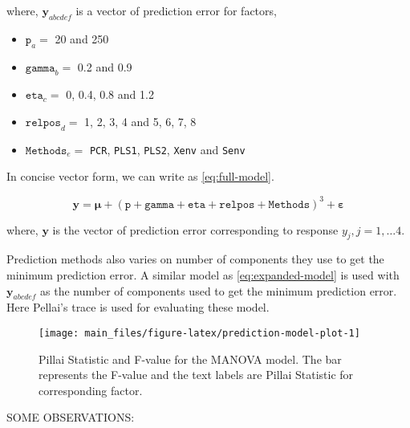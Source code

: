 \documentclass[12pt,3p,authoryear]{elsarticle}
\providecommand{\tightlist}{%
  \setlength{\itemsep}{0pt}\setlength{\parskip}{0pt}}
\theoremstyle{definition}
\theoremstyle{definition}
\theoremstyle{definition}
\theoremstyle{remark}
\begin{document}
where, \(\mathbf{y}_{abcdef}\) is a vector of prediction error for
factors,

\begin{itemize}
\tightlist
\item
  \(\texttt{p}_a =\) 20 and 250
\item
  \(\texttt{gamma}_b=\) 0.2 and 0.9
\item
  \(\texttt{eta}_c=\) 0, 0.4, 0.8 and 1.2
\item
  \(\texttt{relpos}_d=\) 1, 2, 3, 4 and 5, 6, 7, 8
\item
  \(\texttt{Methods}_e=\) \texttt{PCR}, \texttt{PLS1}, \texttt{PLS2},
  \texttt{Xenv} and \texttt{Senv}
\end{itemize}

In concise vector form, we can write as \eqref{eq:full-model}.

\begin{equation}
\mathbf{y} = \boldsymbol{\mu} + (\texttt{p} + \texttt{gamma} + \texttt{eta} + \texttt{relpos} + \texttt{Methods})^3 + \boldsymbol{\varepsilon}
\label{eq:full-model}
\end{equation}

where, \(\mathbf{y}\) is the vector of prediction error corresponding to
response \(y_j, j = 1, \ldots 4\).

Prediction methods also varies on number of components they use to get
the minimum prediction error. A similar model as \eqref{eq:expanded-model}
is used with \(\mathbf{y}_{abcdef}\) as the number of components used to
get the minimum prediction error. Here Pellai's trace is used for
evaluating these model.

\begin{figure}
\texttt{[image: main\_files/figure-latex/prediction-model-plot-1]} \caption{Pillai Statistic and F-value for the MANOVA model. The bar represents the F-value and the text labels are Pillai Statistic for corresponding factor.}\label{fig:prediction-model-plot}
\end{figure}

SOME OBSERVATIONS:
\end{document}
